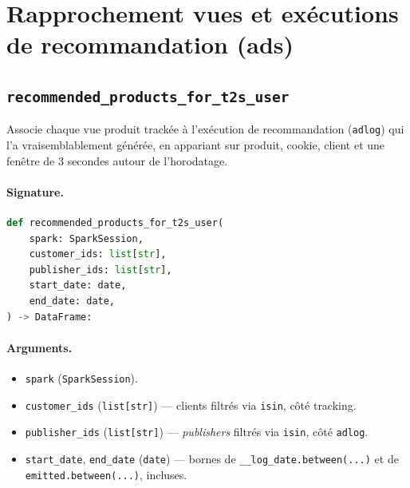 \documentclass[11pt,a4paper]{article}
\newcommand{\code}[1]{\texttt{\small #1}}
\begin{document}
\section{Rapprochement vues et exécutions de recommandation (ads)}

\subsection{\texttt{recommended\_products\_for\_t2s\_user}}
\label{subsec:fn-recommended-products-for-t2s-user}

Associe chaque vue produit trackée à l'exécution de recommandation
(\code{adlog}) qui l'a vraisemblablement générée, en appariant sur produit,
cookie, client et une fenêtre de 3 secondes autour de l'horodatage.

\paragraph{Signature.}\leavevmode\par
\begin{lstlisting}[language=Python]
def recommended_products_for_t2s_user(
    spark: SparkSession,
    customer_ids: list[str],
    publisher_ids: list[str],
    start_date: date,
    end_date: date,
) -> DataFrame:
\end{lstlisting}

\paragraph{Arguments.}
\begin{itemize}[nosep,leftmargin=*]
  \item \code{spark} (\code{SparkSession}).
  \item \code{customer\_ids} (\code{list[str]}) --- clients filtrés via
        \code{isin}, côté tracking.
  \item \code{publisher\_ids} (\code{list[str]}) --- \emph{publishers} filtrés via
        \code{isin}, côté \code{adlog}.
  \item \code{start\_date}, \code{end\_date} (\code{date}) --- bornes de
        \code{\_\_log\_date.between(...)} et de \code{emitted.between(...)},
        incluses.
\end{itemize}
\end{document}
